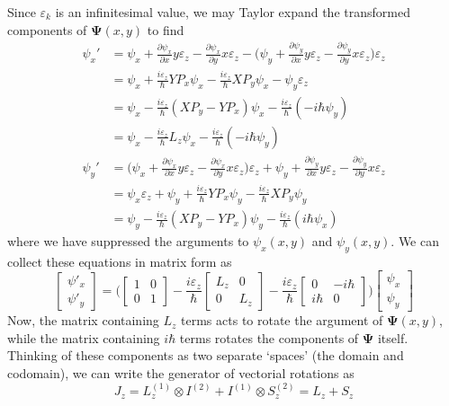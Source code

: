\documentclass[../principles-of-quantum-mechanics.tex]{subfiles}
\begin{document}
\begin{questions}
	\begin{solution}
		Since $\varepsilon_k$ is an infinitesimal value, we may Taylor expand the transformed components of $\boldsymbol{\Psi}(x, y)$ to find
		\begin{align*}
			\psi_x' &= \psi_x + \frac{\partial\psi_x}{\partial x}y\varepsilon_z - \frac{\partial\psi_x}{\partial y}x\varepsilon_z - \Big(\psi_y + \frac{\partial \psi_y}{\partial x}y\varepsilon_z - \frac{\partial\psi_y}{\partial y}x\varepsilon_z\Big)\varepsilon_z \\
			&= \psi_x + \frac{i\varepsilon_z}{\hbar}YP_x\psi_x - \frac{i\varepsilon_z}{\hbar}XP_y\psi_x - \psi_y\varepsilon_z \\
			&= \psi_x - \frac{i\varepsilon_z}{\hbar}(XP_y - YP_x)\psi_x - \frac{i\varepsilon_z}{\hbar}(-i\hbar\psi_y) \\
			&= \psi_x - \frac{i\varepsilon_z}{\hbar}L_z\psi_x - \frac{i\varepsilon_z}{\hbar}(-i\hbar\psi_y) \\
			\psi_y' &= \Big(\psi_x + \frac{\partial \psi_x}{\partial x}y\varepsilon_z - \frac{\partial \psi_x}{\partial y}x\varepsilon_z\Big)\varepsilon_z + \psi_y + \frac{\partial\psi_y}{\partial x}y\varepsilon_z - \frac{\partial \psi_y}{\partial y}x\varepsilon_z \\
			&= \psi_x\varepsilon_z + \psi_y + \frac{i\varepsilon_z}{\hbar}YP_x\psi_y - \frac{i\varepsilon_z}{\hbar}XP_y\psi_y \\
			&= \psi_y - \frac{i\varepsilon_z}{\hbar}(XP_y - YP_x)\psi_y - \frac{i\varepsilon_z}{\hbar}(i\hbar\psi_x)
		\end{align*}
		where we have suppressed the arguments to $\psi_x(x, y)$ and $\psi_y(x, y)$. We can collect these equations in matrix form as
		$$\begin{bmatrix}
		\psi'_x \\ \psi'_y
		\end{bmatrix}= \Big(\begin{bmatrix}1 & 0 \\ 0 & 1\end{bmatrix} - \frac{i\varepsilon_z}{\hbar}\begin{bmatrix}L_z & 0 \\ 0 & L_z\end{bmatrix} - \frac{i\varepsilon_z}{\hbar}\begin{bmatrix}0 & -i\hbar \\ i\hbar & 0\end{bmatrix}\Big)\begin{bmatrix}\psi_x \\ \psi_y\end{bmatrix}$$
		Now, the matrix containing $L_z$ terms acts to rotate the argument of $\boldsymbol{\Psi}(x, y)$, while the matrix containing $i\hbar$ terms rotates the components of $\boldsymbol{\Psi}$ itself. Thinking of these components as two separate `spaces' (the domain and codomain), we can write the generator of vectorial rotations as
		$$J_z = L_z^{(1)}\otimes I^{(2)} + I^{(1)}\otimes S_z^{(2)} = L_z + S_z$$
		\end{solution}
	

\end{questions}
\end{document}
